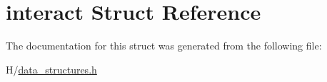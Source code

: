 \hypertarget{structinteract}{
\section{interact Struct Reference}
\label{structinteract}
}


The documentation for this struct was generated from the following file:\begin{DoxyCompactItemize}
\item 
H/\hyperlink{data__structures_8h}{data\_\-structures.h}\end{DoxyCompactItemize}
